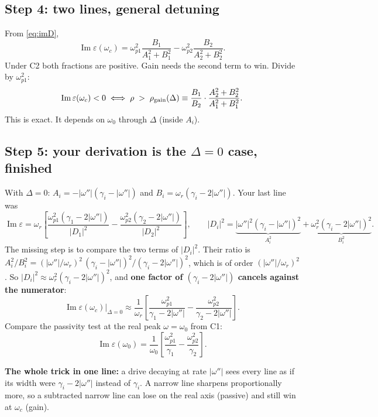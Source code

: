 \documentclass[11pt]{article}
\newcommand{\wi}{|\omega''|}          %
\newcommand{\wpa}{\omega_{p1}}
\newcommand{\wpb}{\omega_{p2}}
\renewcommand{\Im}{\operatorname{Im}}
\begin{document}
\subsection*{Step 4: two lines, general detuning}
From \eqref{eq:imD},
\begin{equation}
  \Im\varepsilon(\omega_c) = \wpa^2\frac{B_1}{A_1^2+B_1^2} - \wpb^2\frac{B_2}{A_2^2+B_2^2}.
\end{equation}
Under C2 both fractions are positive. Gain needs the second term to win. Divide by $\wpa^2$:
\begin{equation}
  \Im\varepsilon(\omega_c)<0 \iff
  \rho \;>\; \rho_{\rm gain}(\Delta) \equiv \frac{B_1}{B_2}\cdot\frac{A_2^2+B_2^2}{A_1^2+B_1^2}.
  \label{eq:rhogain}
\end{equation}
This is exact. It depends on $\omega_0$ through $\Delta$ (inside $A_i$).

\subsection*{Step 5: your derivation is the $\Delta=0$ case, finished}
With $\Delta=0$: $A_i=-\wi(\gamma_i-\wi)$ and $B_i=\omega_r(\gamma_i-2\wi)$. Your last line was
\begin{equation}
  \Im\varepsilon = \omega_r\left[\frac{\wpa^2(\gamma_1-2\wi)}{|D_1|^2} - \frac{\wpb^2(\gamma_2-2\wi)}{|D_2|^2}\right],
  \qquad
  |D_i|^2 = \underbrace{\wi^2(\gamma_i-\wi)^2}_{A_i^2} + \underbrace{\omega_r^2(\gamma_i-2\wi)^2}_{B_i^2}.
\end{equation}
The missing step is to compare the two terms of $|D_i|^2$.
Their ratio is $A_i^2/B_i^2 = (\wi/\omega_r)^2\,(\gamma_i-\wi)^2/(\gamma_i-2\wi)^2$, which is of order $(\wi/\omega_r)^2$.
So $|D_i|^2\approx\omega_r^2(\gamma_i-2\wi)^2$, and \textbf{one factor of $(\gamma_i-2\wi)$ cancels against the numerator}:
\begin{equation}
  \Im\varepsilon(\omega_c)\Big|_{\Delta=0} \approx \frac{1}{\omega_r}\left[\frac{\wpa^2}{\gamma_1-2\wi} - \frac{\wpb^2}{\gamma_2-2\wi}\right].
  \label{eq:onres}
\end{equation}
Compare the passivity test at the real peak $\omega=\omega_0$ from C1:
\begin{equation}
  \Im\varepsilon(\omega_0) = \frac{1}{\omega_0}\left[\frac{\wpa^2}{\gamma_1} - \frac{\wpb^2}{\gamma_2}\right].
\end{equation}
\begin{result}
\textbf{The whole trick in one line:} a drive decaying at rate $\wi$ sees every line as if its width were $\gamma_i-2\wi$ instead of $\gamma_i$.
A narrow line sharpens proportionally more, so a subtracted narrow line can lose on the real axis (passive) and still win at $\omega_c$ (gain).
\end{result}
\end{document}
